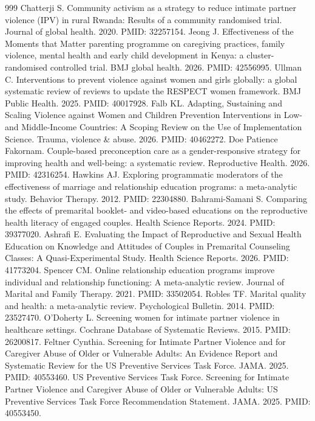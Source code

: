 \documentclass[11pt]{article}
\begin{document}
\begin{thebibliography}{999}
 Chatterji S. Community activism as a strategy to reduce intimate partner violence (IPV) in rural Rwanda: Results of a community randomised trial. Journal of global health. 2020. PMID: 32257154.
 Jeong J. Effectiveness of the Moments that Matter parenting programme on caregiving practices, family violence, mental health and early child development in Kenya: a cluster-randomised controlled trial. BMJ global health. 2026. PMID: 42556995.
 Ullman C. Interventions to prevent violence against women and girls globally: a global systematic review of reviews to update the RESPECT women framework. BMJ Public Health. 2025. PMID: 40017928.
 Falb KL. Adapting, Sustaining and Scaling Violence against Women and Children Prevention Interventions in Low- and Middle-Income Countries: A Scoping Review on the Use of Implementation Science. Trauma, violence \& abuse. 2026. PMID: 40462272.
 Doe Patience Fakornam. Couple-based preconception care as a gender-responsive strategy for improving health and well-being: a systematic review. Reproductive Health. 2026. PMID: 42316254.
 Hawkins AJ. Exploring programmatic moderators of the effectiveness of marriage and relationship education programs: a meta-analytic study. Behavior Therapy. 2012. PMID: 22304880.
 Bahrami-Samani S. Comparing the effects of premarital booklet- and video-based educations on the reproductive health literacy of engaged couples. Health Science Reports. 2024. PMID: 39377020.
 Ashrafi E. Evaluating the Impact of Reproductive and Sexual Health Education on Knowledge and Attitudes of Couples in Premarital Counseling Classes: A Quasi-Experimental Study. Health Science Reports. 2026. PMID: 41773204.
 Spencer CM. Online relationship education programs improve individual and relationship functioning: A meta-analytic review. Journal of Marital and Family Therapy. 2021. PMID: 33502054.
 Robles TF. Marital quality and health: a meta-analytic review. Psychological Bulletin. 2014. PMID: 23527470.
 O'Doherty L. Screening women for intimate partner violence in healthcare settings. Cochrane Database of Systematic Reviews. 2015. PMID: 26200817.
 Feltner Cynthia. Screening for Intimate Partner Violence and for Caregiver Abuse of Older or Vulnerable Adults: An Evidence Report and Systematic Review for the US Preventive Services Task Force. JAMA. 2025. PMID: 40553460.
 US Preventive Services Task Force. Screening for Intimate Partner Violence and Caregiver Abuse of Older or Vulnerable Adults: US Preventive Services Task Force Recommendation Statement. JAMA. 2025. PMID: 40553450.

\end{thebibliography}
\end{document}

